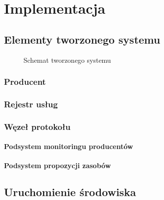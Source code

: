 \chapter{Implementacja}
\section{Elementy tworzonego systemu}
\begin{figure}[!htbp]
    \centering
    
    \caption{Schemat tworzonego systemu}
    \label{fig:enter-label}
\end{figure}

\restoregeometry
\newpage

\subsection{Producent}
\subsection{Rejestr usług}
\subsection{Węzeł protokołu}
\subsubsection{Podsystem monitoringu producentów}
\subsubsection{Podsystem propozycji zasobów}

\section{Uruchomienie środowiska}